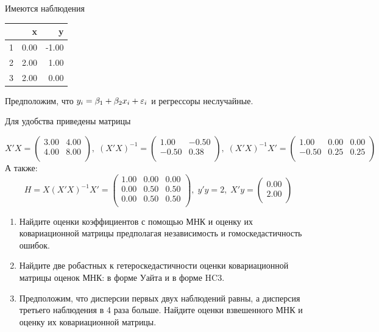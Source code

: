 \begin{problem}
Имеются наблюдения

\begin{tabular}{rrr}
  \hline
 & x & y \\ 
  \hline
1 & 0.00 & -1.00 \\ 
  2 & 2.00 & 1.00 \\ 
  3 & 2.00 & 0.00 \\ 
   \hline
\end{tabular}

Предположим, что $y_i=\beta_1 + \beta_2 x_i + \varepsilon_i$ и регрессоры неслучайные.

Для удобства приведены матрицы

\[
X'X=
\begin{pmatrix}{}
  3.00 & 4.00 \\ 
  4.00 & 8.00 \\ 
  \end{pmatrix}, \;
(X'X)^{-1}=
\begin{pmatrix}{}
  1.00 & -0.50 \\ 
  -0.50 & 0.38 \\ 
  \end{pmatrix}, \;
(X'X)^{-1}X'=
\begin{pmatrix}{}
  1.00 & 0.00 & 0.00 \\ 
  -0.50 & 0.25 & 0.25 \\ 
  \end{pmatrix}
\]
А также:
\[
H=X(X'X)^{-1}X'=
\begin{pmatrix}{}
  1.00 & 0.00 & 0.00 \\ 
  0.00 & 0.50 & 0.50 \\ 
  0.00 & 0.50 & 0.50 \\ 
  \end{pmatrix}
, \;
y'y= 2, \;
X'y= \begin{pmatrix}{}
  0.00 \\ 
  2.00 \\ 
  \end{pmatrix}
\]

\begin{enumerate}
\item Найдите оценки коэффициентов с помощью МНК и оценку их ковариационной матрицы предполагая независимость и гомоскедастичность ошибок.

\item Найдите две робастных к гетероскедастичности оценки ковариационной матрицы оценок МНК: в форме Уайта и в форме HC3.

\item  Предположим, что дисперсии первых двух наблюдений равны, а дисперсия третьего наблюдения в 4 раза больше. Найдите оценки взвешенного МНК и оценку их ковариационной матрицы.


\end{enumerate}
\end{problem}
